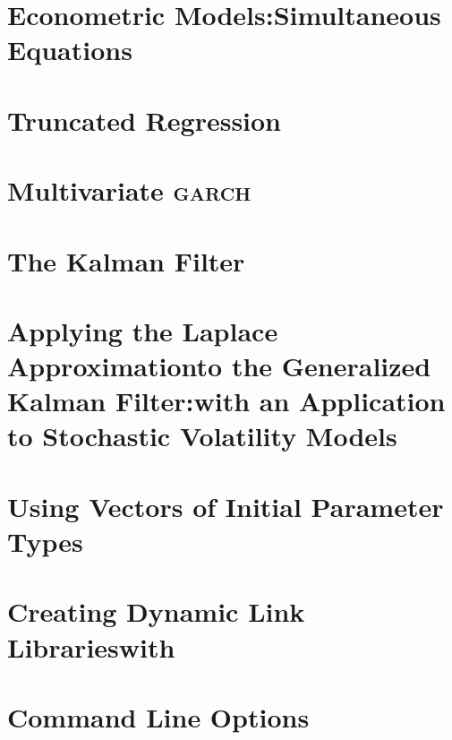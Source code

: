 \documentclass{admbmanual}
\begin{document}
\chapter{Econometric Models:\br Simultaneous Equations}
 \x


\chapter{Truncated Regression}


\chapter{Multivariate \textsc{garch}}


\chapter{The Kalman Filter}
 \x


\chapter{Applying the Laplace Approximation\br to the Generalized Kalman Filter:\br with an Application to Stochastic Volatility Models}
 \x


\chapter{Using Vectors of Initial Parameter Types} 
 \x


\chapter{Creating Dynamic Link Libraries\br with \ADM}


\chapter{Command Line Options}
 \x


%
\end{document}
